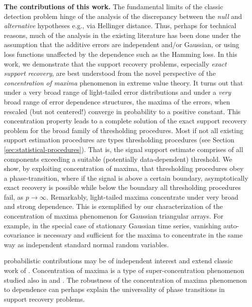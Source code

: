      
{\bf The contributions of this work.} The fundamental limits of the classic detection problem hinge 
of the analysis of the discrepancy between the {\em null} and {\em alternative} hypotheses e.g., via Hellinger distance.  Thus, perhaps 
for  technical reasons, much of the analysis in the existing literature has been done under the assumption that the additive errors are 
independent and/or Gaussian, or using loss functions unaffected by the dependence such as the Hamming loss.  
In this work, we demonstrate that the support recovery problems, especially {\em exact support recovery}, are best understood from 
the novel perspective of the {\em concentration of maxima} phenomenon in extreme value theory.  It turns out that under a very broad 
range of light-tailed error distributions and under a {\em very} broad range of error dependence structures, the maxima of the errors, 
when rescaled (but not centered!) converge in probability to a positive constant. This concentration property leads to a complete solution 
of the exact  support recovery problem for the broad family of thresholding procedures.  Most if not all existing support estimation 
procedures are types thresholding procedures (see Section \ref{sec:statistical-procedures}).   
That is, the signal support estimate comprises of all components exceeding a suitable (potentially data-dependent)  threshold.  We show, by exploiting concentration of maxima, that thresholding procedures obey a phase-transition, where if the signal is above a 
certain boundary, asymptotically exact recovery is possible while below the boundary all thresholding procedures fail, as $p\to\infty$.  
Remarkably, light-tailed maxima concentrate under very broad and strong dependence.  This is exemplified by our characterization of
the concentration of maxima phenomenon for Gaussian triangular arrays.  For example, in the special case of stationary Gaussian time
series, vanishing auto-covariance is necessary and sufficient for the maxima to concentrate in the same way as independent standard 
normal random variables.    

 probabilistic contributions may be of independent interest and extend classic work of \cite{berman1964limit}. 
Concentration of maxima is a type of super-concentration phenomenon studied also in \cite{chatterjee2014superconcentration} 
and \cite{tanguy:2015}. The robustness of the concentration of maxima phenomenon to dependence can perhaps explain the universality 
of phase transitions in support recovery problems. 

